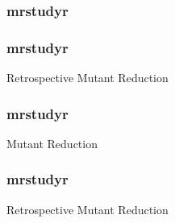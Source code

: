   \begin{frame}
    \frametitle{mrstudyr}
    \begin{figure}[!htb]
    \centering
    \vspace*{-2cm}
    
    \end{figure}
  \end{frame}


  \begin{frame}
    \frametitle{mrstudyr}
    \centering
    {\HUGE Retrospective Mutant Reduction}
  \end{frame}

  \begin{frame}
    \frametitle{mrstudyr}
    \centering
    {\HUGE {\textcolor{solarizedViolet}{Retrospective}} Mutant Reduction}
  \end{frame}

  \begin{frame}
    \frametitle{mrstudyr}
    \centering
    {\HUGE Retrospective {\textcolor{solarizedViolet}{Mutant Reduction}}}
  \end{frame}

